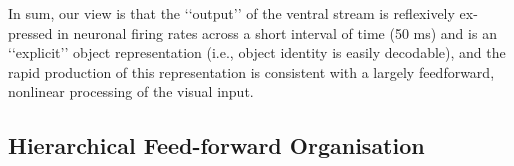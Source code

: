 
In sum, our
view is that the ‘‘output’’ of the ventral stream is reflexively ex-
pressed in neuronal firing rates across a short interval of time
(50 ms) and is an ‘‘explicit’’ object representation (i.e., object
identity is easily decodable), and the rapid production of this
representation is consistent with a largely feedforward, nonlinear
processing of the visual input.
\subsection{Hierarchical Feed-forward Organisation }

